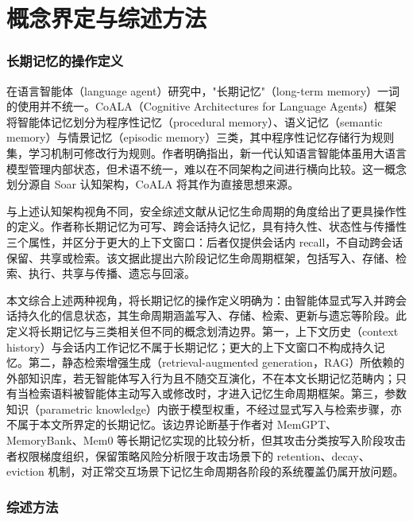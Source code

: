 \section{概念界定与综述方法}

\subsubsection{长期记忆的操作定义}

在语言智能体（language agent）研究中，"长期记忆"（long-term memory）一词的使用并不统一。CoALA（Cognitive Architectures for Language Agents）框架将智能体记忆划分为程序性记忆（procedural memory）、语义记忆（semantic memory）与情景记忆（episodic memory）三类，其中程序性记忆存储行为规则集，学习机制可修改行为规则\cite{W0140}。作者明确指出，新一代认知语言智能体虽用大语言模型管理内部状态，但术语不统一，难以在不同架构之间进行横向比较\cite{W0140}。这一概念划分源自 Soar 认知架构，CoALA 将其作为直接思想来源\cite{W0140}。

与上述认知架构视角不同，安全综述文献从记忆生命周期的角度给出了更具操作性的定义。作者称长期记忆为可写、跨会话持久记忆，具有持久性、状态性与传播性三个属性，并区分于更大的上下文窗口：后者仅提供会话内 recall，不自动跨会话保留、共享或检索\cite{W0039}。该文据此提出六阶段记忆生命周期框架，包括写入、存储、检索、执行、共享与传播、遗忘与回滚\cite{W0039}。

本文综合上述两种视角，将长期记忆的操作定义明确为：由智能体显式写入并跨会话持久化的信息状态，其生命周期涵盖写入、存储、检索、更新与遗忘等阶段。此定义将长期记忆与三类相关但不同的概念划清边界。第一，上下文历史（context history）与会话内工作记忆不属于长期记忆；更大的上下文窗口不构成持久记忆\cite{W0039}。第二，静态检索增强生成（retrieval-augmented generation，RAG）所依赖的外部知识库，若无智能体写入行为且不随交互演化，不在本文长期记忆范畴内；只有当检索语料被智能体主动写入或修改时，才进入记忆生命周期框架。第三，参数知识（parametric knowledge）内嵌于模型权重，不经过显式写入与检索步骤，亦不属于本文所界定的长期记忆。该边界论断基于作者对 MemGPT、MemoryBank、Mem0 等长期记忆实现的比较分析\cite{W0039}，但其攻击分类按写入阶段攻击者权限梯度组织，保留策略风险分析限于攻击场景下的 retention、decay、eviction 机制\cite{W0039}，对正常交互场景下记忆生命周期各阶段的系统覆盖仍属开放问题。

\subsubsection{综述方法}

